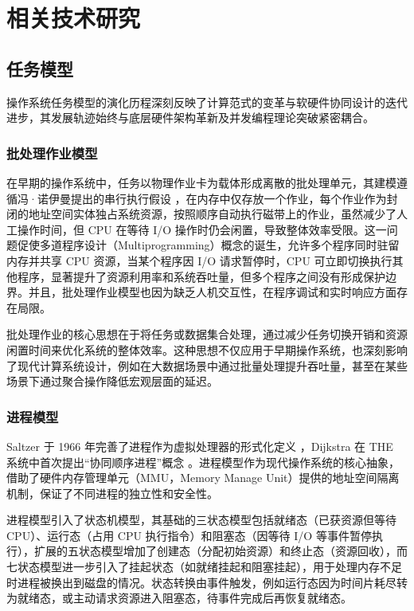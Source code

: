 
\chapter{相关技术研究}

\section{任务模型}


操作系统任务模型的演化历程深刻反映了计算范式的变革与软硬件协同设计的迭代进步，其发展轨迹始终与底层硬件架构革新及并发编程理论突破紧密耦合。

\subsection{批处理作业模型}

在早期的操作系统中，任务以物理作业卡为载体形成离散的批处理单元，其建模遵循冯·诺伊曼提出的串行执行假设 \cite{VonNeumann}，在内存中仅存放一个作业，每个作业作为封闭的地址空间实体独占系统资源，按照顺序自动执行磁带上的作业，虽然减少了人工操作时间，但 CPU 在等待 I/O 操作时仍会闲置，导致整体效率受限。这一问题促使多道程序设计（Multiprogramming）概念的诞生，允许多个程序同时驻留内存并共享 CPU 资源，当某个程序因 I/O 请求暂停时，CPU 可立即切换执行其他程序，显著提升了资源利用率和系统吞吐量，但多个程序之间没有形成保护边界。并且，批处理作业模型也因为缺乏人机交互性，在程序调试和实时响应方面存在局限。
    
批处理作业的核心思想在于将任务或数据集合处理，通过减少任务切换开销和资源闲置时间来优化系统的整体效率。这种思想不仅应用于早期操作系统，也深刻影响了现代计算系统设计，例如在大数据场景中通过批量处理提升吞吐量，甚至在某些场景下通过聚合操作降低宏观层面的延迟。

\subsection{进程模型}
    
Saltzer 于 1966 年完善了进程作为虚拟处理器的形式化定义 \cite{saltzer1966traffic}，Dijkstra 在 THE 系统中首次提出“协同顺序进程”概念 \cite{dijkstra1968structure}。进程模型作为现代操作系统的核心抽象，借助了硬件内存管理单元（MMU，Memory Manage Unit）提供的地址空间隔离机制，保证了不同进程的独立性和安全性。

进程模型引入了状态机模型，其基础的三状态模型包括就绪态（已获资源但等待 CPU）、运行态（占用 CPU 执行指令）和阻塞态（因等待 I/O 等事件暂停执行），扩展的五状态模型增加了创建态（分配初始资源）和终止态（资源回收），而七状态模型进一步引入了挂起状态（如就绪挂起和阻塞挂起），用于处理内存不足时进程被换出到磁盘的情况。状态转换由事件触发，例如运行态因为时间片耗尽转为就绪态，或主动请求资源进入阻塞态，待事件完成后再恢复就绪态。

